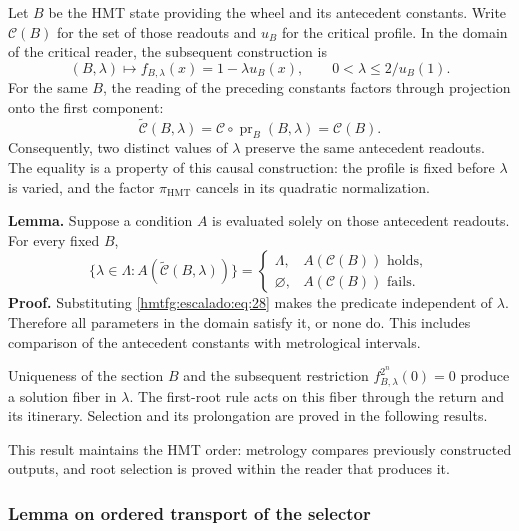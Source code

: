 Let \(B\) be the HMT state providing the wheel and its antecedent constants. Write \(\mathcal C(B)\) for the set of those readouts and \(u_B\) for the critical profile. In the domain of the critical reader, the subsequent construction is
\begin{equation}
(B,\lambda)\longmapsto f_{B,\lambda}(x)=1-\lambda u_B(x),
\qquad 0<\lambda\le 2/u_B(1).
\label{hmtfg:escalado:eq:27}
\end{equation}
For the same \(B\), the reading of the preceding constants factors through projection onto the first component:
\begin{equation}
\widetilde{\mathcal C}(B,\lambda)
=\mathcal C\circ\operatorname{pr}_B(B,\lambda)
=\mathcal C(B).
\label{hmtfg:escalado:eq:28}
\end{equation}
Consequently, two distinct values of \(\lambda\) preserve the same antecedent readouts. The equality is a property of this causal construction: the profile is fixed before \(\lambda\) is varied, and the factor \(\pi_{\mathrm{HMT}}\) cancels in its quadratic normalization.

\textbf{Lemma.} Suppose a condition \(A\) is evaluated solely on those antecedent readouts. For every fixed \(B\),
\begin{equation}
\{\lambda\in\Lambda:A(\widetilde{\mathcal C}(B,\lambda))\}
=
\begin{cases}
\Lambda,&A(\mathcal C(B))\text{ holds},\\
\varnothing,&A(\mathcal C(B))\text{ fails}.
\end{cases}
\label{hmtfg:escalado:eq:29}
\end{equation}
\textbf{Proof.} Substituting \eqref{hmtfg:escalado:eq:28} makes the predicate independent of \(\lambda\). Therefore all parameters in the domain satisfy it, or none do. This includes comparison of the antecedent constants with metrological intervals.

Uniqueness of the section \(B\) and the subsequent restriction \(f_{B,\lambda}^{2^n}(0)=0\) produce a solution fiber in \(\lambda\). The first-root rule acts on this fiber through the return and its itinerary. Selection and its prolongation are proved in the following results.

This result maintains the HMT order: metrology compares previously constructed outputs, and root selection is proved within the reader that produces it.

\subsubsection{Lemma on ordered transport of the selector}
\label{hmtfg:escalado:13.3}

